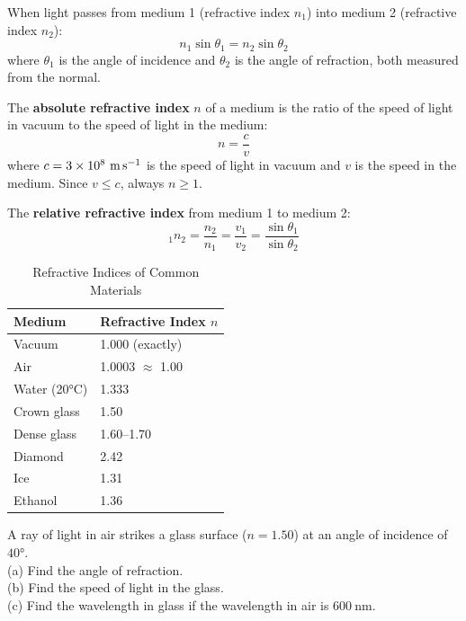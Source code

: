 \begin{lawbox}
When light passes from medium 1 (refractive index
$n_1$) into medium 2 (refractive index $n_2$):
\[
  n_1\sin\theta_1 = n_2\sin\theta_2
\]
where $\theta_1$ is the angle of incidence and
$\theta_2$ is the angle of refraction, both measured
from the normal.
\end{lawbox}

\begin{definitionbox}
The \textbf{absolute refractive index} $n$ of a medium
is the ratio of the speed of light in vacuum to the
speed of light in the medium:
\[
  n = \frac{c}{v}
\]
where $c = 3\times10^8\ \text{m\,s}^{-1}$ is the
speed of light in vacuum and $v$ is the speed in
the medium. Since $v \leq c$, always $n \geq 1$.

The \textbf{relative refractive index} from medium
1 to medium 2:
\[
  {}_1n_2 = \frac{n_2}{n_1} = \frac{v_1}{v_2}
  = \frac{\sin\theta_1}{\sin\theta_2}
\]
\end{definitionbox}

\begin{table}[H]
\centering
\caption{Refractive Indices of Common Materials}
\label{tab:refractive_index}
\begin{tabular}{ll}
\toprule
\textbf{Medium} & \textbf{Refractive Index $n$}\\
\midrule
Vacuum & 1.000 (exactly)\\
Air & 1.0003 $\approx$ 1.00\\
Water (20°C) & 1.333\\
Crown glass & 1.50\\
Dense glass & 1.60--1.70\\
Diamond & 2.42\\
Ice & 1.31\\
Ethanol & 1.36\\
\bottomrule
\end{tabular}
\end{table}

\begin{examplebox}[20.1]
A ray of light in air strikes a glass surface
($n = 1.50$) at an angle of incidence of $40°$.\\
(a) Find the angle of refraction.\\
(b) Find the speed of light in the glass.\\
(c) Find the wavelength in glass if the wavelength
in air is $600\ \text{nm}$.
\end{examplebox}

